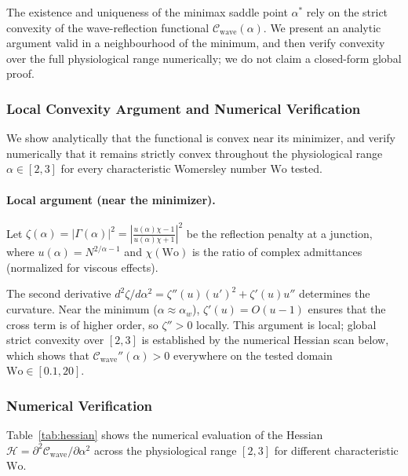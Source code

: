 \documentclass[11pt,a4paper]{article}
\theoremstyle{remark}
\begin{document}
The existence and uniqueness of the minimax saddle point $\alpha^*$ rely on the
strict convexity of the wave-reflection functional
$\mathcal{C}_{\mathrm{wave}}(\alpha)$. We present an analytic argument
valid in a neighbourhood of the minimum, and then verify convexity over the full
physiological range numerically; we do not claim a closed-form global proof.

\subsubsection{Local Convexity Argument and Numerical Verification}

We show analytically that the functional is convex near its minimizer, and
verify numerically that it remains strictly convex throughout the physiological
range $\alpha \in [2, 3]$ for every characteristic Womersley number
$\mathrm{Wo}$ tested.

\paragraph{Local argument (near the minimizer).}
Let $\zeta(\alpha) = |\Gamma(\alpha)|^2 = \left| \frac{u(\alpha)\chi -
1}{u(\alpha)\chi + 1} \right|^2$ be the reflection penalty at a junction, where
$u(\alpha) = N^{2/\alpha-1}$ and $\chi(\mathrm{Wo})$ is the ratio of complex
admittances (normalized for viscous effects).

The second derivative $d^2\zeta/d\alpha^2 = \zeta''(u) (u')^2 + \zeta'(u) u''$
determines the curvature. Near the minimum ($\alpha \approx \alpha_w$),
$\zeta'(u) = O(u-1)$ ensures that the cross term is of higher order, so
$\zeta''>0$ locally. This argument is local; global strict convexity over
$[2,3]$ is established by the numerical Hessian scan below, which shows
that $\mathcal{C}_{\mathrm{wave}}''(\alpha) > 0$ everywhere on the tested domain
$\mathrm{Wo} \in [0.1, 20]$.

\subsubsection{Numerical Verification}

Table~\ref{tab:hessian} shows the numerical evaluation of the Hessian
$\mathcal{H} = \partial^2 \mathcal{C}_{\mathrm{wave}} / \partial \alpha^2$
across the physiological range $[2, 3]$ for different characteristic
$\mathrm{Wo}$.
\end{document}
